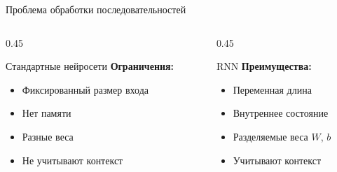 \documentclass[aspectratio=169, 10pt]{beamer}
\begin{document}
\begin{frame}{Проблема обработки последовательностей}
  \begin{columns}[T]
    \begin{column}{0.45\textwidth}
      \begin{block}{Стандартные нейросети}
        \textbf{Ограничения:}
        \begin{itemize}
          \item Фиксированный размер входа
          \item Нет памяти
          \item Разные веса
          \item Не учитывают контекст
        \end{itemize}
      \end{block}
    \end{column}
    
    \begin{column}{0.45\textwidth}
      \begin{block}{RNN}
        \textbf{Преимущества:}
        \begin{itemize}
          \item Переменная длина
          \item Внутреннее состояние
          \item Разделяемые веса $W$, $b$           \item Учитывают контекст
        \end{itemize}
      \end{block}
    \end{column}
  \end{columns}
\end{frame}
\end{document}
